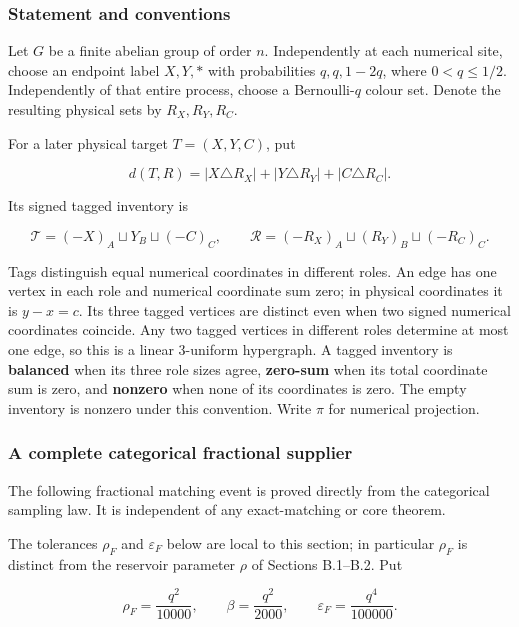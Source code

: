 \documentclass[11pt,a4paper]{article}
\begin{document}
\hypertarget{statement-and-conventions}{%
\subsubsection{Statement and conventions}\label{statement-and-conventions}}

Let \(G\) be a finite abelian group of order \(n\). Independently at each numerical site, choose an endpoint label \(X,Y,*\) with probabilities \(q,q,1-2q\), where \(0<q\le 1/2\). Independently of that entire process, choose a Bernoulli-\(q\) colour set. Denote the resulting physical sets by \(R_X,R_Y,R_C\).

For a later physical target \(T=(X,Y,C)\), put

\[
d(T,R)=|X\triangle R_X|+|Y\triangle R_Y|+|C\triangle R_C|.
\]

Its signed tagged inventory is

\[
\mathcal T=(-X)_A\sqcup Y_B\sqcup(-C)_C,
\qquad
\mathcal R=(-R_X)_A\sqcup(R_Y)_B\sqcup(-R_C)_C.
\]

Tags distinguish equal numerical coordinates in different roles. An edge has one vertex in each role and numerical coordinate sum zero; in physical coordinates it is \(y-x=c\). Its three tagged vertices are distinct even when two signed numerical coordinates coincide. Any two tagged vertices in different roles determine at most one edge, so this is a linear 3-uniform hypergraph. A tagged inventory is \textbf{balanced} when its three role sizes agree, \textbf{zero-sum} when its total coordinate sum is zero, and \textbf{nonzero} when none of its coordinates is zero. The empty inventory is nonzero under this convention. Write \(\pi\) for numerical projection.

\hypertarget{a-complete-categorical-fractional-supplier}{%
\subsubsection{A complete categorical fractional supplier}\label{a-complete-categorical-fractional-supplier}}

The following fractional matching event is proved directly from the categorical sampling law. It is independent of any exact-matching or core theorem.

The tolerances \(\rho_F\) and \(\varepsilon_F\) below are local to this section; in particular \(\rho_F\) is distinct from the reservoir parameter \(\rho\) of Sections B.1--B.2. Put

\[
\rho_F=\frac{q^2}{10000},\qquad
\beta=\frac{q^2}{2000},\qquad
\varepsilon_F=\frac{q^4}{100000}.
\]
\end{document}
